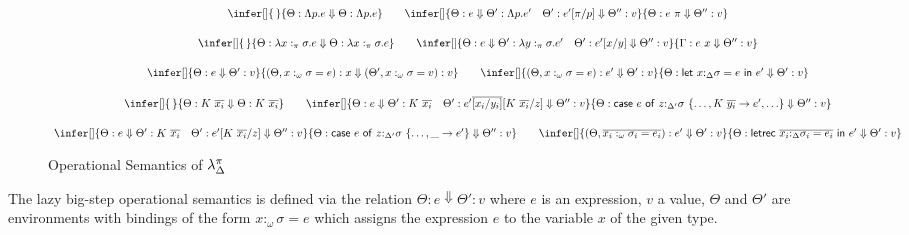 \documentclass[acmsmall,review,anonymous,screen]{acmart}
\newcommand{\llet}[2]{\mathsf{let}~#1~\mathsf{in}~#2}
\newcommand{\lletrec}[2]{\mathsf{letrec}~#1~\mathsf{in}~#2}
\newcommand{\ccase}[2]{\mathsf{case}~#1~\mathsf{of}~#2}
\begin{document}
\begin{figure}

  {\small
    \[
  \begin{array}{c}
    \infer[]
    {\,}
    {\Theta : \Lambda p.e \Downarrow \Theta : \Lambda p.e}
    \qquad
    \infer[]
    {\Theta : e\Downarrow \Theta' : \Lambda p.e' \quad \Theta' :
    e'[\pi/p]\Downarrow \Theta'' : v}
    {\Theta : e~\pi\Downarrow \Theta'' : v }\\[1.5em]
    \infer[]
    {\,}
    {\Theta : \lambda x:_\pi \sigma . e \Downarrow \Theta : \lambda x:_\pi \sigma . e }
    \qquad
    \infer[]
    {\Theta : e \Downarrow \Theta' : \lambda y:_\pi \sigma . e' \quad
    \Theta' : e'[x/y] \Downarrow \Theta'' : v }
    {\Gamma : e~x \Downarrow \Theta'' : v}\\[1.5em]
    \infer[]
    {\Theta : e \Downarrow \Theta' : v}
    {(\Theta , x:_\omega \sigma = e) : x \Downarrow (\Theta',x:_\omega
    \sigma = v) : v}
    \qquad
    \infer[]
    {(\Theta,x:_\omega \sigma = e) : e' \Downarrow \Theta' : v}
    {\Theta : \llet{x{:}_{\Delta}\sigma = e}{e'}\Downarrow \Theta' : v
    }\\[1.5em]
    \infer[]
    {\,}
    {\Theta : K~\ov{x_i} \Downarrow \Theta : K~\ov{x_i}}
    \qquad
    \infer[]
    {\Theta : e \Downarrow \Theta' : K~\ov{x_i} \quad
    \Theta' : e'\ov{[x_i/y_i]}[K~\ov{x_i}/z] \Downarrow \Theta'' : v }
    {\Theta :
    \ccase{e}{z{:}_{\Delta'}\sigma~\{{\dots,K~\ov{y_i} \to e', {\dots}}\}}
    \Downarrow \Theta'' : v}\\[1.5em]
    \infer[]
    {\Theta : e \Downarrow \Theta' : K~\ov{x_i} \quad
    \Theta' : e'[K~\ov{x_i}/z] \Downarrow \Theta'' : v }
    {\Theta :
    \ccase{e}{z{:}_{\Delta'}\sigma~\{\dots , \_\to
    e'}\} \Downarrow \Theta'' : v}
    \qquad
    \infer[]
    {%
    (\Theta, \overline{x_i:_\omega \sigma_i = e_i}) : e' \Downarrow \Theta'
    : v
    }
    {\Theta : \lletrec{\overline{x_i{:}_{\Delta}\sigma_i = e_i}}{e'}
    \Downarrow \Theta' : v}
    \end{array}
\]}
    \caption{Operational Semantics of $\lambda^\pi_\Delta$\label{fig:opsem}}
  \end{figure}

  The lazy big-step operational semantics is defined via the relation
$\Theta : e \Downarrow \Theta' : v$ where $e$ is an expression, $v$ a
value, $\Theta$ and $\Theta'$ are environments with bindings of the
form $x:_\omega\sigma = e$ which assigns the expression $e$ to the
variable $x$ of the given type.
\end{document}
